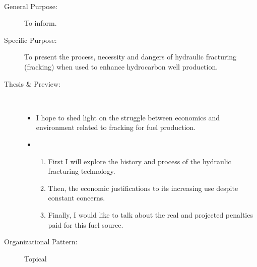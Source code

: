 \documentclass{article}
\begin{document}
  \mbox{}\\[-.2cm]
  \begin{description}
    \item[General Purpose:] To inform.
    \item[Specific Purpose:] To present the process, necessity and dangers of hydraulic fracturing (fracking) when used to enhance hydrocarbon well production.
    \item[Thesis \& Preview:] \mbox{}\\[-.5cm]
      \begin{itemize}
        \item I hope to shed light on the struggle between economics and environment related to fracking for fuel production.
        \item 
          \begin{enumerate}
            \item First I will explore the history and process of the hydraulic fracturing technology.
            \item Then, the economic justifications to its increasing use despite constant concerns.
            \item Finally, I would like to talk about the real and projected penalties paid for this fuel source.
          \end{enumerate}
      \end{itemize}
    \item[Organizational Pattern:] Topical
  \end{description}
\end{document}
